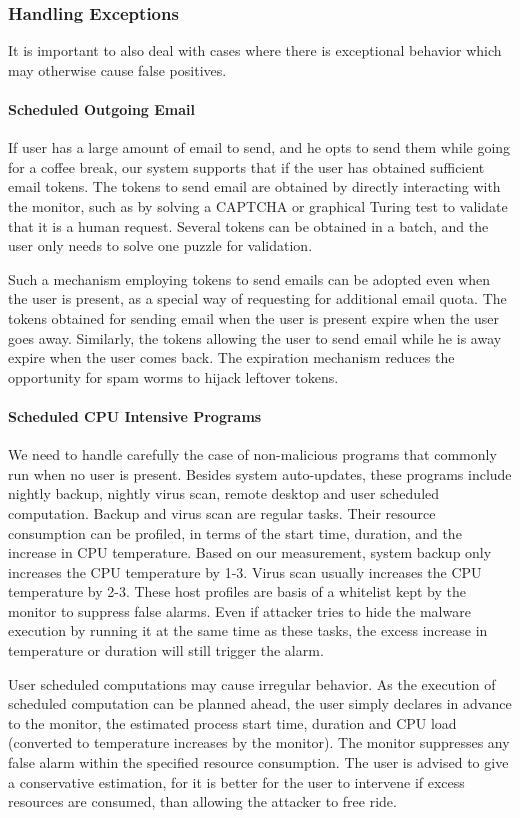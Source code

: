 \subsubsection{Handling Exceptions}

It is important to also deal with cases where there is exceptional
behavior which may otherwise cause false positives.

\paragraph{Scheduled Outgoing Email}
If user has a large amount of email to send, and he opts to send them while going for a coffee break, our system supports that if the user has obtained sufficient email tokens. 
The tokens to send email are obtained by directly interacting with the monitor,
such as by solving a CAPTCHA \cite{captcha} or graphical Turing test
to validate that it is a human request.
Several tokens can be obtained in a batch, and the user only needs to solve one puzzle for validation.

Such a mechanism employing tokens to send emails can be adopted even when 
the user is present, as a special way of requesting for additional email quota. The tokens obtained for sending email when the user is present expire when 
the user goes away. 
Similarly, the tokens allowing the user to send email while he is away expire when the user comes back. The expiration mechanism reduces the opportunity 
for spam worms to hijack leftover tokens.

\paragraph{Scheduled CPU Intensive Programs}
We need to handle carefully the case of non-malicious programs that commonly
run when no user is present. Besides system auto-updates, these
programs include nightly backup, nightly virus scan, remote desktop
and user scheduled computation. Backup and virus scan are regular
tasks. Their resource consumption can be profiled, in terms of the
start time, duration, and the increase in CPU temperature. Based on
our measurement, system backup only increases the CPU temperature by
1-3\degree. Virus scan usually increases the CPU temperature by
2-3\degree. These host profiles are basis of a whitelist kept by
the monitor to suppress false alarms. Even if attacker tries to hide
the malware execution by running it at the same time as these tasks,
the excess increase in temperature or duration will still trigger
the alarm.

User scheduled computations may cause irregular behavior.
As the execution of scheduled computation can be planned ahead, the
user simply declares in advance to the monitor, the estimated process
start time, duration and CPU load
(converted to temperature increases by the monitor).
The monitor suppresses any
false alarm within the specified resource consumption. The user is
advised to give a conservative estimation, for it is better for the
user to intervene if excess resources are consumed, than allowing
the attacker to free ride. 
